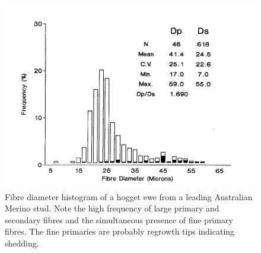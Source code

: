 %

\begin{figure}[h]
  \centering
  \includegraphics[width=\textwidth,trim = 0 0 0 20]{images/fig8.png}
  \caption{Fibre diameter histogram of a hogget ewe from a leading
     Australian Merino stud.  Note the high frequency of large primary
     and secondary fibres and the simultaneous presence of fine
     primary fibres.  The fine primaries are probably regrowth tips
     indicating shedding.}
  \label{fig:8}
\end{figure}

%
